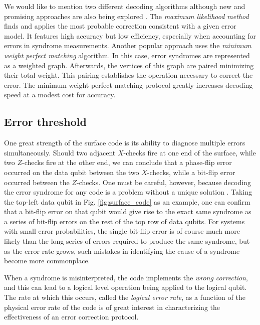 We would like to mention two different decoding algorithms although new and
promising approaches are also being explored \cite{Varsamopoulos_2020}. The
\textit{maximum likelihood method} finds and applies the most probable
correction consistent with a given error model. It features high accuracy but
low efficiency, especially when accounting for errors in syndrome measurements.
Another popular approach uses the \textit{minimum weight perfect matching}
\cite{fowler2013minimum} algorithm. In this case, error syndromes are
represented as a weighted graph. Afterwards, the vertices of this graph are
paired minimizing their total weight. This pairing establishes the operation
necessary to correct the error. The minimum weight perfect matching protocol
greatly increases decoding speed at a modest cost for accuracy.

\subsection{Error threshold}
One great strength of the surface code is its ability to diagnose multiple
errors simultaneously. Should two adjacent $X$-checks fire at one end of the
surface, while two $Z$-checks fire at the other end, we can conclude that a
phase-flip error occurred on the data qubit between the two $X$-checks, while a
bit-flip error occurred between the $Z$-checks. One must be careful, however,
because decoding the error syndrome for any code is a problem without a unique
solution \cite{terhal15}. Taking the top-left data qubit in Fig.
\ref{fig:surface_code} as an example, one can confirm that a bit-flip error on
that qubit would give rise to the exact same syndrome as a series of bit-flip
errors on the rest of the top row of data qubits. For systems with small error
probabilities, the single bit-flip error is of course much more likely than the
long series of errors required to produce the same syndrome, but as the error
rate grows, such mistakes in identifying the cause of a syndrome become more
commonplace.

When a syndrome is misinterpreted, the code implements the \textit{wrong
  correction}, and this can lead to a logical level operation being applied to
the logical qubit. The rate at which this occurs, called the \textit{logical
  error rate}, as a function of the physical error rate of the code is of great
interest in characterizing the effectiveness of an error correction protocol.

